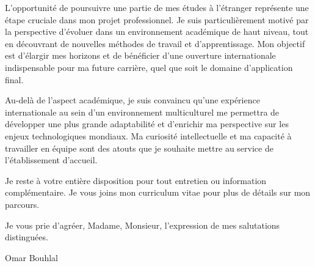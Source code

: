 \documentclass[11pt,a4paper]{article}
\begin{document}
L'opportunité de poursuivre une partie de mes études à l'étranger représente une étape cruciale dans mon projet professionnel. Je suis particulièrement motivé par la perspective d'évoluer dans un environnement académique de haut niveau, tout en découvrant de nouvelles méthodes de travail et d'apprentissage. Mon objectif est d'élargir mes horizons et de bénéficier d'une ouverture internationale indispensable pour ma future carrière, quel que soit le domaine d'application final.

Au-delà de l'aspect académique, je suis convaincu qu'une expérience internationale au sein d'un environnement multiculturel me permettra de développer une plus grande adaptabilité et d'enrichir ma perspective sur les enjeux technologiques mondiaux. Ma curiosité intellectuelle et ma capacité à travailler en équipe sont des atouts que je souhaite mettre au service de l'établissement d'accueil.

Je reste à votre entière disposition pour tout entretien ou information complémentaire. Je vous joins mon curriculum vitae pour plus de détails sur mon parcours.

Je vous prie d'agréer, Madame, Monsieur, l'expression de mes salutations distinguées.

\vspace{2.5em}

Omar Bouhlal
\end{document}
